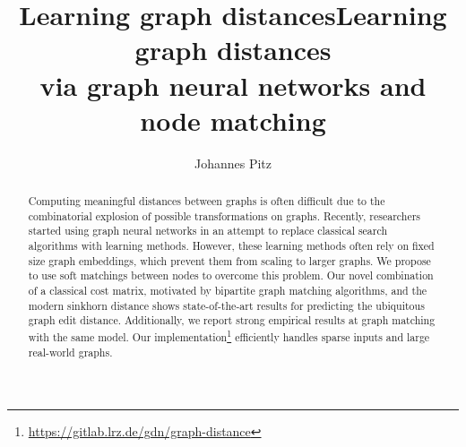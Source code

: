 \documentclass[a4paper,10pt]{article}
\title{Learning graph distances} %
\author{Johannes Pitz} %
\institute{\textit{Guided Research: Data Analytics and Machine Learning Group  \protect\\ TUM Department of Informatics}}
\begin{document}
\title{Learning graph distances \protect\\ via graph neural networks and node matching}
\maketitle

\begin{abstract}


Computing meaningful distances between graphs is often difficult due to the combinatorial explosion of possible transformations on graphs. Recently, researchers started using graph neural networks in an attempt to replace classical search algorithms with learning methods. However, these learning methods often rely on fixed size graph embeddings, which prevent them from scaling to larger graphs. We propose to use soft matchings between nodes to overcome this problem. Our novel combination of a classical cost matrix, motivated by bipartite graph matching algorithms, and the modern sinkhorn distance shows state-of-the-art results for predicting the ubiquitous graph edit distance. Additionally, we report strong empirical results at graph matching with the same model. Our implementation\footnote{\url{https://gitlab.lrz.de/gdn/graph-distance}} efficiently handles sparse inputs and large real-world graphs.






\end{abstract}















\newpage





\newpage


\end{document}

